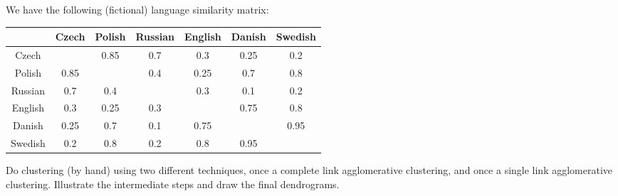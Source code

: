 \documentclass[fontsize=12pt, usenames, dvipsnames, headinclude, headsepline, footinclude, footsepline]{scrartcl}
\title{\normalfont{\bfseries{Machine Learning: Homework 8}}}
\author{Laurent \textsc{Hayez}}
\date{\today}
\begin{document}
\renewcommand{\labelitemi}{\textbullet}



\maketitle




\begin{exo}
  We have the following (fictional) language similarity matrix:

  \begin{center}
    \begin{tabular}{@{}c|cccccc@{}}
      \toprule
      & Czech & Polish & Russian & English & Danish & Swedish \\ \midrule
      Czech   &       & 0.85   & 0.7     & 0.3     & 0.25   & 0.2     \\
      Polish  & 0.85  &        & 0.4     & 0.25    & 0.7    & 0.8     \\
      Russian & 0.7   & 0.4    &         & 0.3     & 0.1    & 0.2     \\
      English & 0.3   & 0.25   & 0.3     &         & 0.75   & 0.8     \\
      Danish  & 0.25  & 0.7    & 0.1     & 0.75    &        & 0.95    \\
      Swedish & 0.2   & 0.8    & 0.2     & 0.8     & 0.95   &         \\ \bottomrule
    \end{tabular}
  \end{center}

  Do clustering (by hand) using two different techniques, once a complete link agglomerative clustering, and
  once a single link agglomerative clustering. Illustrate the intermediate steps and draw the final
  dendrograms.
\end{exo}
\end{document}
